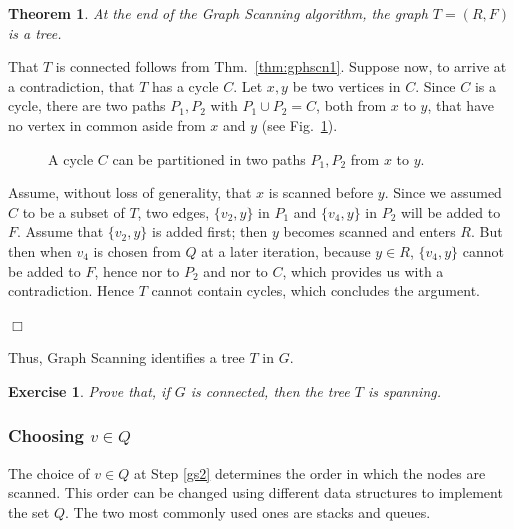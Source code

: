 \documentclass[a4paper]{book}
\theoremstyle{changebreak}                %
\newtheorem{thm}[result]{Theorem}
\newtheorem{ex}[result]{Exercise}
\newenvironment{proof}
 {{\sl Proof.}\hspace*{1 ex}}%
 {{\nopagebreak\hspace*{\fill}$\Box$\par\vspace{12pt}}}
\begin{document}
\begin{thm}
At the end of the {\sc Graph Scanning} algorithm, the graph $T=(R,F)$
is a tree.
\end{thm}
\begin{proof}
That $T$ is connected follows from Thm.~\ref{thm:gphscn1}. Suppose
now, to arrive at a contradiction, that $T$ has a
cycle $C$. Let $x,y$ be two vertices in $C$. Since $C$ is a
cycle, there are two paths $P_1,P_2$ with
$P_1\cup P_2=C$, both from $x$ to $y$, that have no
vertex in common aside from $x$ and $y$ (see
Fig.~\ref{f:cycle2paths}).
\begin{figure}[!ht]
\begin{center}
\end{center}
\caption{A cycle $C$ can be partitioned in two
  paths $P_1,P_2$ from $x$ to $y$.}
\label{f:cycle2paths}
\end{figure}
Assume, without loss of generality, that $x$ is scanned before
$y$. Since we assumed $C$ to be a subset of $T$, two
edges, $\{v_2,y\}$ in $P_1$ and $\{v_4,y\}$ in $P_2$ will
be added to $F$. Assume that $\{v_2,y\}$ is added first; then $y$
becomes scanned and enters $R$. But then when $v_4$ is chosen from $Q$
at a later iteration, because $y\in R$, $\{v_4,y\}$
cannot be added to $F$, hence nor to $P_2$ and nor to $C$, which
provides us with a contradiction. Hence $T$ cannot contain
cycles, which concludes the argument.
\end{proof}
\renewcommand*{\EdgeLineWidth}{0.8pt}

Thus, {\sc Graph Scanning} identifies a tree $T$ in $G$. 
\begin{ex}
Prove that, if $G$ is connected, then the tree $T$ is
spanning.
\end{ex}

\subsubsection{Choosing $v\in Q$}
The choice of $v\in Q$ at Step \ref{gs2} determines the order in which
the nodes are scanned. This order can be changed using different data
structures to implement the set $Q$. The two
most commonly used ones are stacks and
queues.
\end{document}
